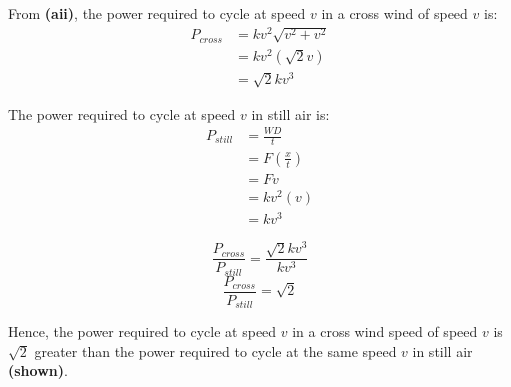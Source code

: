 \documentclass[11pt]{article}
\begin{document}
From \textbf{(aii)}, the power required to cycle at speed \(v\) in a cross wind of speed \(v\) is:
\begin{align*}
P_{cross} &= kv^2 \sqrt{v^2 + v^2} \\
&= kv^2 (\sqrt{2} v) \\
&= \sqrt{2}kv^3
\end{align*}

The power required to cycle at speed \(v\) in still air is:
\begin{align*}
P_{still} &= \frac{WD}{t} \\
&= F \left(\frac{x}{t} \right) \\
&= Fv \\
&= kv^2(v) \\
&= kv^3
\end{align*}

\[\frac{P_{cross}}{P_{still}} = \frac{\sqrt{2}kv^3}{kv^3}\]
\[\frac{P_{cross}}{P_{still}} = \sqrt{2}\]

Hence, the power required to cycle at speed \(v\) in a cross wind speed of speed \(v\) is \(\sqrt{2}\) greater than the power required to cycle at the same speed \(v\) in still air \textbf{(shown)}.
\end{document}

